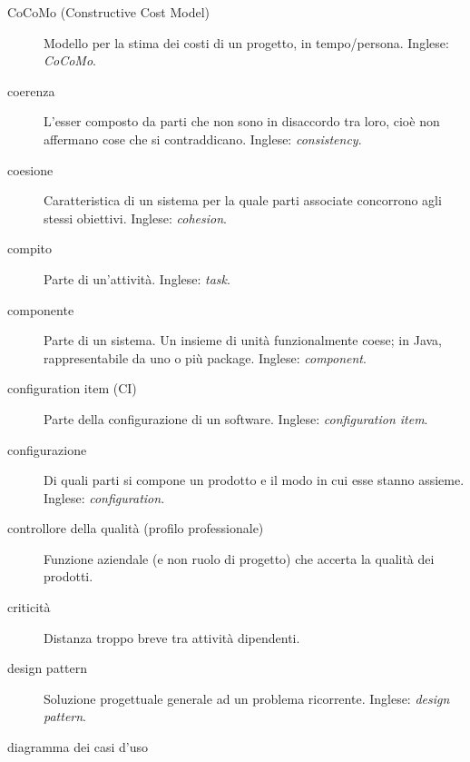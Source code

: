 \documentclass[a4paper]{article}
\begin{document}
\begin{description}
	\item[CoCoMo (Constructive Cost Model)] 

			Modello per la stima dei costi di un progetto, in tempo/persona. Inglese: \emph{CoCoMo}.
			
	\item[coerenza] 

			L'esser composto da parti che non sono in disaccordo tra loro, cioè non affermano cose che si contraddicano. Inglese: \emph{consistency}.
			
	\item[coesione] 

			Caratteristica di un sistema per la quale parti associate concorrono agli stessi obiettivi. Inglese: \emph{cohesion}.
			
	\item[compito] 

			Parte di un'attività. Inglese: \emph{task}.
			
	\item[componente] 

			Parte di un sistema. Un insieme di unità funzionalmente coese; in Java, rappresentabile da uno o più package. Inglese: \emph{component}.
			
	\item[configuration item (CI)] 

			Parte della configurazione di un software. Inglese: \emph{configuration item}.
			
	\item[configurazione] 

			Di quali parti si compone un prodotto e il modo in cui esse stanno assieme. Inglese: \emph{configuration}.
			
	\item[controllore della qualità (profilo professionale)] 

			Funzione aziendale (e non ruolo di progetto) che accerta la qualità dei prodotti.
			
	\item[criticità] 

			Distanza troppo breve tra attività dipendenti.
			
	\item[design pattern] 

			Soluzione progettuale generale ad un problema ricorrente. Inglese: \emph{design pattern}.
			
	\item[diagramma dei casi d'uso] 


\end{description}
\end{document}
